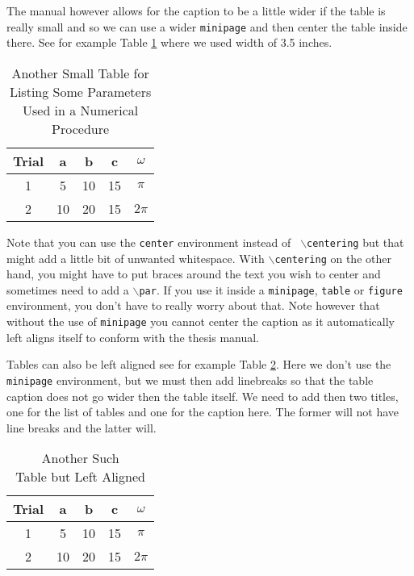 The manual however allows for the caption to be a little wider if the table
is really small and so we can use a wider {\tt minipage} and then center
the table inside there.  See for example Table \ref{wtab} where we used
width of 3.5 inches.
%
\begin{table}[hbt]
\centering
\begin{minipage}{3.5in}
  \centering
  \caption{Another Small Table for Listing Some Parameters Used in a
           Numerical Procedure\label{wtab}}
   \begin{tabular}{|c||c|c|c|c||}    \hline
    Trial &	a  &  b & c & $\omega$ \\ \hline \hline
    1 & 5 & 10  & 15 & $\pi$ \\ \hline
    2 & 10 & 20  & 15 & $2\pi$ \\ \hline
   \end{tabular}
\end{minipage}
\end{table}

Note that you can use the {\tt center} environment instead of {\tt
$\backslash$centering} but that might add a little bit of unwanted
whitespace.  With {\tt $\backslash$centering} on the other hand, you
might have to put braces around the text you wish to center and
sometimes need to add a {\tt $\backslash$par}.  If you use it inside
a {\tt minipage}, {\tt table} or {\tt figure} environment, you don't have
to really worry about that.  Note however that without the use of
{\tt minipage} you cannot center the caption as it automatically left aligns
itself to conform with the thesis manual.

Tables can also be left aligned see for example Table \ref{ltab}.  Here we
don't use the {\tt minipage} environment, but we must then add linebreaks
so that the table caption does not go wider then the table itself.  We need
to add then two titles, one for the list of tables and one for the caption
here.  The former will not have line breaks and the latter will.

\begin{table}[hbt]
 \caption[
   Another such table but left aligned.]{
   Another Such\\Table but Left Aligned\label{ltab}}
 \begin{tabular}{|c||c|c|c|c||}    \hline
  Trial &	a  &  b & c & $\omega$ \\ \hline \hline
  1 & 5 & 10  & 15 & $\pi$ \\ \hline
  2 & 10 & 20  & 15 & $2\pi$ \\ \hline
 \end{tabular}
\end{table}


